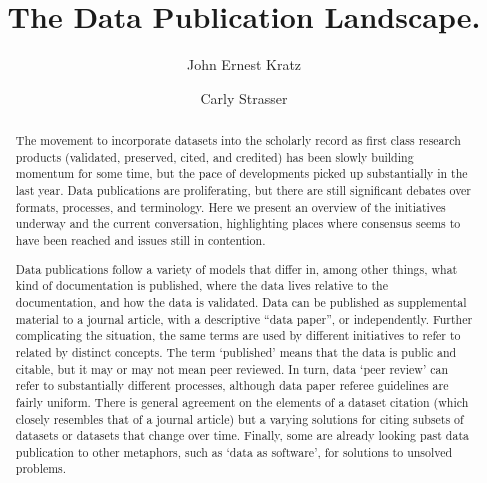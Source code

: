 \documentclass[10pt,twocolumn]{article}
\begin{document}
\title{The Data Publication Landscape.}
\author[1]{John Ernest Kratz}
\author[1]{Carly Strasser}

\maketitle
\thispagestyle{fancy}


\begin{abstract}


The movement to incorporate datasets into the scholarly record as first class research products (validated, preserved, cited, and credited) has been slowly building momentum for some time, but the pace of developments picked up substantially in the last year.
Data publications are proliferating, but there are still significant debates over formats, processes, and terminology.
Here we present an overview of the initiatives underway and the current conversation, highlighting places where consensus seems to have been reached and issues still in contention.

Data publications follow a variety of models that differ in, among other things, what kind of documentation is published, where the data lives relative to the documentation, and how the data is validated.
Data can be published as supplemental material to a journal article, with a descriptive ``data paper'', or independently.
Further complicating the situation, the same terms are used by different initiatives to refer to related by distinct concepts.
The term `published' means that the data is public and citable, but it may or may not mean peer reviewed.
In turn, data `peer review' can refer to substantially different processes, although data paper referee guidelines are fairly uniform.
There is general agreement on the elements of a dataset citation (which closely resembles that of a journal article) but a varying solutions for citing subsets of datasets or datasets that change over time.
Finally, some are already looking past data publication to other metaphors, such as `data as software', for solutions to unsolved problems.

\end{abstract}
\clearpage
\end{document}
